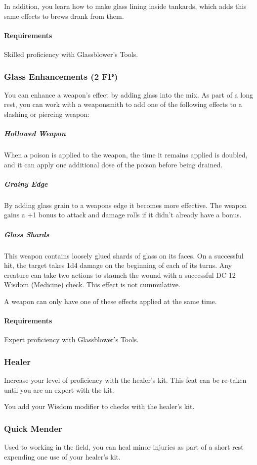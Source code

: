     In addition, you learn how to make glass lining inside tankards, which adds this same effects to brews drank from them.
    \paragraph{Requirements} Skilled proficiency with Glassblower's Tools.
\subsubsection{Glass Enhancements (2 FP)} \label{feat::glassenhancement}
    You can enhance a weapon's effect by adding glass into the mix.
    As part of a long rest, you can work with a weaponsmith to add one of the following effects to a slashing or piercing weapon:
    \subparagraph{Hollowed Weapon} When a poison is applied to the weapon, the time it remains applied is doubled, and it can apply one additional dose of the poison before being drained.
    \subparagraph{Grainy Edge} By adding glass grain to a weapons edge it becomes more effective.
    The weapon gains a +1 bonus to attack and damage rolls if it didn't already have a bonus.
    \subparagraph{Glass Shards} This weapon contains loosely glued shards of glass on its faces.
    On a successful hit, the target takes 1d4 damage on the beginning of each of its turns.
    Any creature can take two actions to staunch the wound with a successful DC 12 Wisdom (Medicine) check.
    This effect is not cummulative.

    A weapon can only have one of these effects applied at the same time.
    \paragraph{Requirements} Expert proficiency with Glassblower's Tools.

\subsubsection{Healer} \label{feat::healer}
    Increase your level of proficiency with the healer's kit.
    This feat can be re-taken until you are an expert with the kit.

    You add your Wisdom modifier to checks with the healer's kit.
\subsubsection{Quick Mender} \label{feat::quickmender}
    Used to working in the field, you can heal minor injuries as part of a short rest expending one use of your healer's kit.

